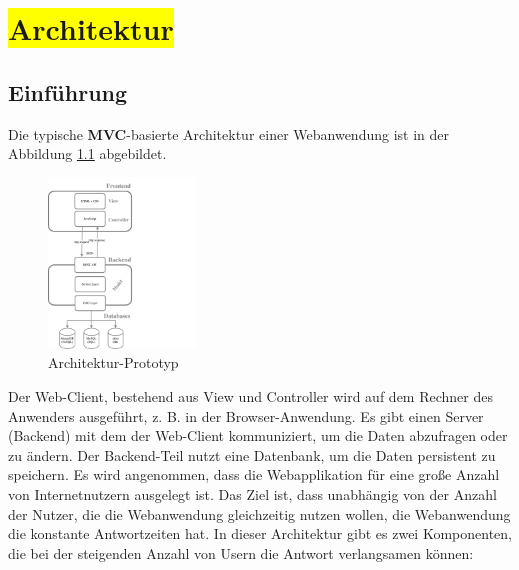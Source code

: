 \chapter{\colorbox{yellow}{Architektur}}

\section{Einführung}

Die typische \textbf{MVC}-basierte Architektur einer Webanwendung ist in der Abbildung \ref{img:architectureMyApp} abgebildet.


\begin{figure}[H]
\vspace{-20pt}%
\centering
\includegraphics[trim = 0mm 0mm 0mm 0mm, clip, width=0.35\textwidth]{resources/architectureMyAppWithoutFrameworks}
\caption[Architektur-Prototyp]{Architektur-Prototyp}
\label{img:architectureMyApp}
\end{figure}

Der Web-Client, bestehend aus View und Controller wird auf dem Rechner des Anwenders ausgeführt, z. B. in der Browser-Anwendung. Es gibt einen Server (Backend) mit dem der Web-Client kommuniziert, um die Daten abzufragen oder zu ändern. Der Backend-Teil nutzt eine Datenbank, um die Daten persistent zu speichern. Es wird angenommen, dass die Webapplikation für eine große Anzahl von Internetnutzern ausgelegt ist. Das Ziel ist, dass unabhängig von der Anzahl der Nutzer, die die Webanwendung gleichzeitig nutzen wollen, die Webanwendung die konstante Antwortzeiten hat. In dieser Architektur gibt es zwei Komponenten, die bei der steigenden Anzahl von Usern die Antwort verlangsamen können:

